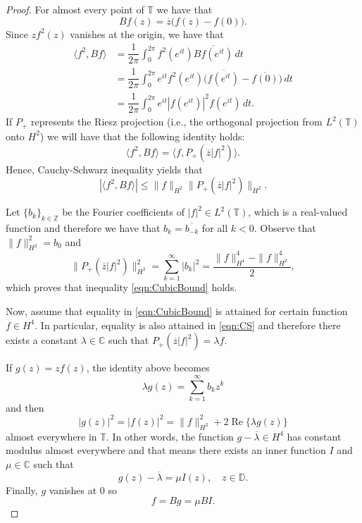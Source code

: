 \documentclass[10pt,a4paper]{amsart}
\newcommand{\C}{\mathbb{C}}
\newcommand{\D}{\mathbb{D}}
\renewcommand{\Re}{\operatorname{Re}}
\newcommand{\T}{\mathbb{T}}
\newcommand{\Z}{\mathbb{Z}}
\begin{document}
        \begin{proof}
            
            For almost every point of $\T$ we have that
            \[
            Bf(z) = \overline{z} \big( f(z) - f(0) \big).
            \]
            Since $z f^2(z)$ vanishes at the origin, we have that
            \begin{align*}
                \langle f^2, Bf \rangle & = \dfrac{1}{2\pi} \int_0^{2\pi} f^2 (e^{it}) \overline{Bf(e^{it})} \, dt \\
                & = \dfrac{1}{2\pi} \int_0^{2\pi} e^{it} f^2 (e^{it}) \big( \overline{f(e^{it})} - \overline{f(0)} \big) \, dt \\
                & = \dfrac{1}{2\pi} \int_{0}^{2\pi} e^{it} |f(e^{it})|^2 f(e^{it}) \, dt.
            \end{align*}
            If $P_+$ represents the Riesz projection (i.e., the orthogonal projection from $L^2(\T)$ onto $H^2$) we will have that the following identity holds:
            \[
            \langle f^2, B f \rangle = \langle f, P_+ ( \overline{z} |f|^2 ) \rangle.
            \]
            Hence, Cauchy-Schwarz inequality yields that
            \begin{equation} \label{eqn:CS}
                | \langle f^2, B f \rangle | \leq \| f \|_{H^2} \| P_+ ( \overline{z} |f|^2 ) \|_{H^2}.
            \end{equation}
            
            Let $\{ b_k \}_{k \in \Z}$ be the Fourier coefficients of $|f|^2 \in L^2(\T)$, which is a real-valued function and therefore we have that $b_k = \overline{b_{-k}}$ for all $k < 0$. Observe that $\| f \|_{H^2}^2 = b_0$ and
            \[
            \| P_+ (\overline{z}|f|^2) \|_{H^2}^2 = \sum_{k = 1}^\infty |b_k|^2 = \dfrac{\|f\|_{H^4}^4 - \| f \|_{H^2}^4}{2},
            \]
            which proves that inequality \eqref{eqn:CubicBound} holds.
            
            Now, assume that equality in \eqref{eqn:CubicBound} is attained for certain function $f \in H^4$. In particular, equality is also attained in \eqref{eqn:CS} and therefore there exists a constant $\lambda \in \C$ such that $P_+ (\overline{z}|f|^2) = \lambda f$.
            
            If $g(z) = z f(z)$, the identity above becomes
            \[
            \lambda g(z) = \sum_{k = 1}^\infty b_k z^k
            \]
            and then
            \[
            |g(z)|^2 = |f(z)|^2 = \|f\|_{H^2}^2 + 2 \Re \{ \lambda g(z) \}
            \]
            almost everywhere in $\T$. In other words, the function $g - \overline{\lambda} \in H^4$ has constant modulus almost everywhere and that means there exists an inner function $I$ and $\mu \in \C$ such that
            \[
            g(z) - \overline{\lambda} = \mu I(z), \quad z \in \D.
            \]
            Finally, $g$ vanishes at 0 so
            \[
            f = Bg = \mu B I.
            \]
        \end{proof}
\end{document}
